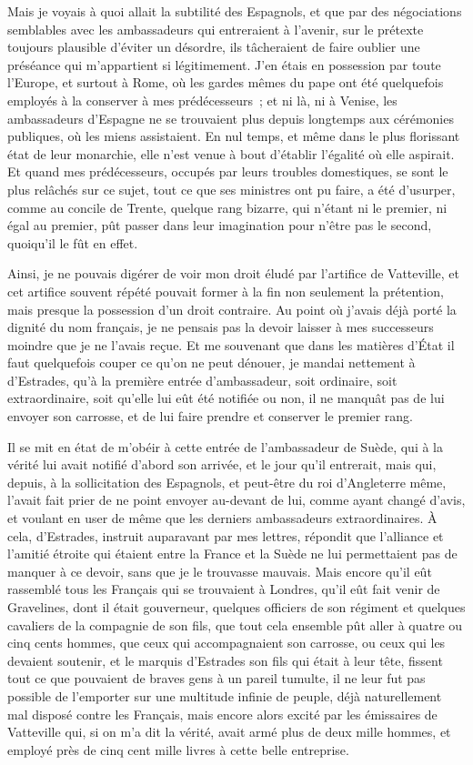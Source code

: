 \documentclass[french,twoside]{book} %
\begin{document}
Mais je voyais à quoi allait la subtilité des Espagnols, et que par des négociations semblables avec les ambassadeurs qui entreraient à l’avenir, sur le prétexte toujours plausible d’éviter un désordre, ils tâcheraient de faire oublier une préséance qui m’appartient si légitimement. J’en étais en possession par toute l’Europe, et surtout à Rome, où les gardes mêmes du pape ont été quelquefois employés à la conserver à mes prédécesseurs ; et ni là, ni à Venise, les ambassadeurs d’Espagne ne se trouvaient plus depuis longtemps aux cérémonies publiques, où les miens assistaient. En nul temps, et même dans le plus florissant état de leur monarchie, elle n’est venue à bout d’établir l’égalité où elle aspirait. Et quand mes prédécesseurs, occupés par leurs troubles domestiques, se sont le plus relâchés sur ce sujet, tout ce que ses ministres ont pu faire, a été d’usurper, comme au concile de Trente, quelque rang bizarre, qui n’étant ni le premier, ni égal au premier, pût passer dans leur imagination pour n’être pas le second, quoiqu’il le fût en effet.\par
Ainsi, je ne pouvais digérer de voir mon droit éludé par l’artifice de Vatteville, et cet artifice souvent répété pouvait former à la fin non seulement la prétention, mais presque la possession d’un droit contraire. Au point où j’avais déjà porté la dignité du nom français, je ne pensais pas la devoir laisser à mes successeurs moindre que je ne l’avais reçue. Et me souvenant que dans les matières d’État il faut quelquefois couper ce qu’on ne peut dénouer, je mandai nettement à d’Estrades, qu’à la première entrée d’ambassadeur, soit ordinaire, soit extraordinaire, soit qu’elle lui eût été notifiée ou non, il ne manquât pas de lui envoyer son carrosse, et de lui faire prendre et conserver le premier rang.\par
Il se mit en état de m’obéir à cette entrée de l’ambassadeur de Suède, qui à la vérité lui avait notifié d’abord son arrivée, et le jour qu’il entrerait, mais qui, depuis, à la sollicitation des Espagnols, et peut-être du roi d’Angleterre même, l’avait fait prier de ne point envoyer au-devant de lui, comme ayant changé d’avis, et voulant en user de même que les derniers ambassadeurs extraordinaires. À cela, d’Estrades, instruit auparavant par mes lettres, répondit que l’alliance et l’amitié étroite qui étaient entre la France et la Suède ne lui permettaient pas de manquer à ce devoir, sans que je le trouvasse mauvais. Mais encore qu’il eût rassemblé tous les Français qui se trouvaient à Londres, qu’il eût fait venir de Gravelines, dont il était gouverneur, quelques officiers de son régiment et quelques cavaliers de la compagnie de son fils, que tout cela ensemble pût aller à quatre ou cinq cents hommes, que ceux qui accompagnaient son carrosse, ou ceux qui les devaient soutenir, et le marquis d’Estrades son fils qui était à leur tête, fissent tout ce que pouvaient de braves gens à un pareil tumulte, il ne leur fut pas possible de l’emporter sur une multitude infinie de peuple, déjà naturellement mal disposé contre les Français, mais encore alors excité par les émissaires de Vatteville qui, si on m’a dit la vérité, avait armé plus de deux mille hommes, et employé près de cinq cent mille livres à cette belle entreprise.\par
\end{document}
